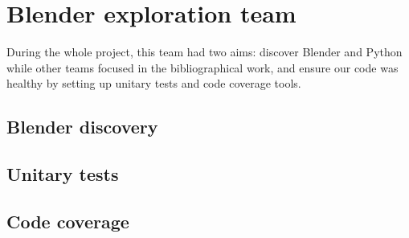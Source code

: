 \section{Blender exploration team}
During the whole project, this team had two aims: discover Blender and
Python while other teams focused in the bibliographical work, and
ensure our code was healthy by setting up unitary tests and code
coverage tools.

\subsection{Blender discovery}


\subsection{Unitary tests}


\subsection{Code coverage}
